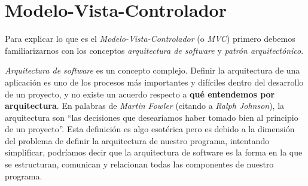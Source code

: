 \section{Modelo-Vista-Controlador}
  Para explicar lo que es el \textit{Modelo-Vista-Controlador} (o \textit{MVC}) primero debemos 
  familiarizarnos con los conceptos \textit{arquitectura de software} y \textit{patrón 
  arquitectónico}.

  \textit{Arquitectura de software} es un concepto complejo.
  Definir la arquitectura de una aplicación es uno de los procesos más importantes y difíciles 
  dentro del desarrollo de un proyecto, y no existe un acuerdo respecto a \textbf{qué entendemos por 
  arquitectura}.
  En palabras de \textit{Martin Fowler} (citando a \textit{Ralph Johnson}), la arquitectura son 
  \enquote{las decisiones que desearíamos haber tomado bien al principio de un 
  proyecto}.\autocite{fowler-software-architecture}
  Esta definición es algo esotérica pero es debido a la dimensión del problema de definir la 
  arquitectura de nuestro programa, intentando simplificar, podríamos decir que la arquitectura de
  software es la forma en la que se estructuran, comunican y relacionan todas las componentes de 
  nuestro programa.